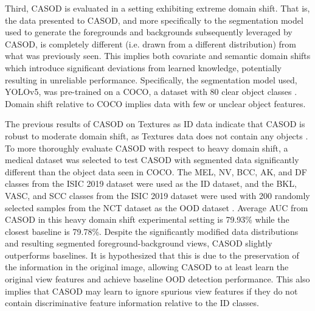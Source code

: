 Third, CASOD is evaluated in a setting exhibiting extreme domain shift. That is, the data presented to CASOD, and more specifically to the segmentation model used to generate the foregrounds and backgrounds subsequently leveraged by CASOD, is completely different (i.e. drawn from a different distribution) from what was previously seen. This implies both covariate and semantic domain shifts which introduce significant deviations from learned knowledge, potentially resulting in unreliable performance. Specifically, the segmentation model used, YOLOv5, was pre-trained on a COCO, a dataset with 80 clear object classes \cite{jocher2020ultralytics}. Domain shift relative to COCO implies data with few or unclear object features.

The previous results of CASOD on Textures as ID data indicate that CASOD is robust to moderate domain shift, as Textures data does not contain any objects \cite{cimpoi2014describing}. To more thoroughly evaluate CASOD with respect to heavy domain shift, a medical dataset was selected to test CASOD with segmented data significantly different than the object data seen in COCO. The MEL, NV, BCC, AK, and DF classes from the ISIC 2019 dataset \cite{codella2018skin} were used as the ID dataset, and the BKL, VASC, and SCC classes from the ISIC 2019 dataset were used with 200 randomly selected samples from the NCT dataset \cite{kather2018100} as the OOD dataset \cite{narayanaswamy2023exploring}. Average AUC from CASOD in this heavy domain shift experimental setting is 79.93\% while the closest baseline is 79.78\%. Despite the significantly modified data distributions and resulting segmented foreground-background views, CASOD slightly outperforms baselines. It is hypothesized that this is due to the preservation of the information in the original image, allowing CASOD to at least learn the original view features and achieve baseline OOD detection performance. This also implies that CASOD may learn to ignore spurious view features if they do not contain discriminative feature information relative to the ID classes.


